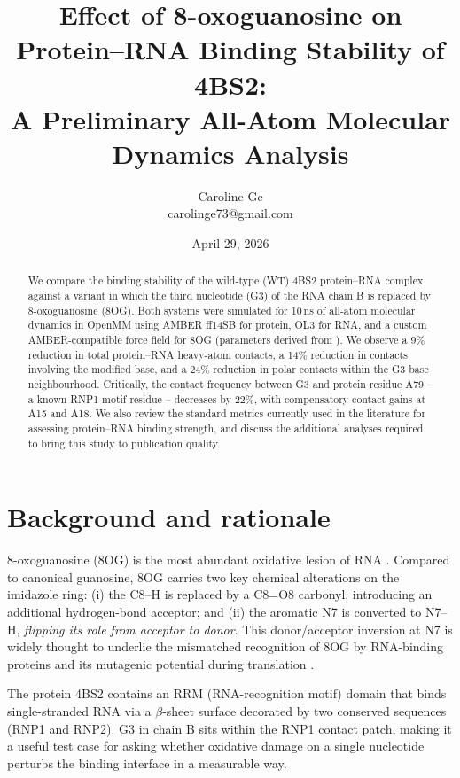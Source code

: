 \documentclass[11pt,a4paper]{article}
\title{Effect of 8-oxoguanosine on Protein--RNA Binding Stability of 4BS2:\\
\large A Preliminary All-Atom Molecular Dynamics Analysis}
\author{Caroline Ge\\\small carolinge73@gmail.com}
\date{April 29, 2026}
\begin{document}
\maketitle

\begin{abstract}
\noindent
We compare the binding stability of the wild-type (WT) 4BS2 protein--RNA complex
against a variant in which the third nucleotide (G3) of the RNA chain B is
replaced by 8-oxoguanosine (8OG). Both systems were simulated for 10\,ns of
all-atom molecular dynamics in OpenMM using AMBER ff14SB for protein, OL3 for
RNA, and a custom AMBER-compatible force field for 8OG (parameters derived
from \citealt{Aduri2007}). We observe a 9\% reduction in total
protein--RNA heavy-atom contacts, a 14\% reduction in contacts involving the
modified base, and a 24\% reduction in polar contacts within the G3 base
neighbourhood. Critically, the contact frequency between G3 and protein
residue A79 -- a known RNP1-motif residue -- decreases by 22\%, with
compensatory contact gains at A15 and A18. We also review the standard
metrics currently used in the literature for assessing protein--RNA binding
strength, and discuss the additional analyses required to bring this study
to publication quality.
\end{abstract}

\section{Background and rationale}
\label{sec:bg}

8-oxoguanosine (8OG) is the most abundant oxidative lesion of RNA
\citep{Cooke2003}. Compared to canonical guanosine, 8OG carries two key
chemical alterations on the imidazole ring: (i) the C8--H is replaced by a
C8=O8 carbonyl, introducing an additional hydrogen-bond acceptor; and
(ii) the aromatic N7 is converted to N7--H, \emph{flipping its role from
acceptor to donor}. This donor/acceptor inversion at N7 is widely thought
to underlie the mismatched recognition of 8OG by RNA-binding proteins and
its mutagenic potential during translation
\citep{Tanaka2007,Simms2017}.

The protein 4BS2 contains an RRM (RNA-recognition motif) domain that binds
single-stranded RNA via a $\beta$-sheet surface decorated by two conserved
sequences (RNP1 and RNP2). G3 in chain B sits within the RNP1 contact
patch, making it a useful test case for asking whether oxidative damage
on a single nucleotide perturbs the binding interface in a measurable way.
\end{document}
